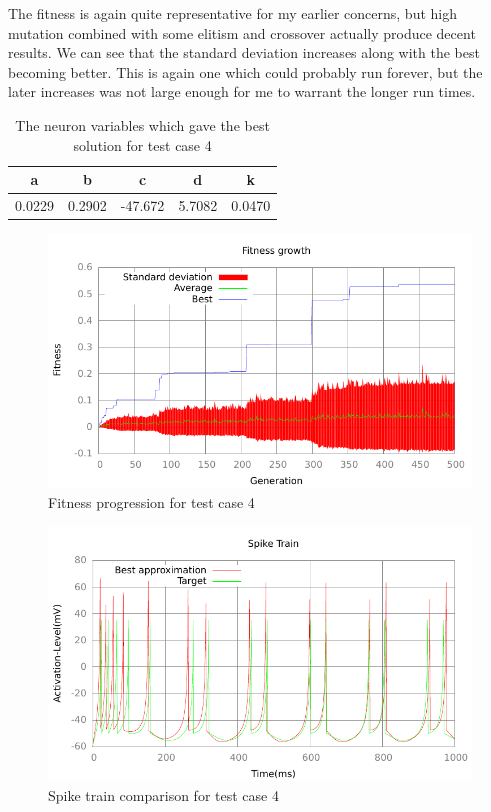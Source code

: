 The fitness is again quite representative for my earlier concerns, but high
mutation combined with some elitism and crossover actually produce decent
results. We can see that the standard deviation increases along with the best
becoming better. This is again one which could probably run forever, but the
later increases was not large enough for me to warrant the longer run times.
\begin{table}
	\begin{tabular}{c c c c c}
		a & b & c & d & k \\
		\hline
		0.0229 & 0.2902 & -47.672 & 5.7082 & 0.0470
	\end{tabular}
	\caption{The neuron variables which gave the best solution for test case
	4}
\end{table}
\begin{figure}[h]
	\centering
	\includegraphics{../output/stdm_izzy_2_fitness.pdf}
	\caption{Fitness progression for test case 4}
	\label{fig:fitness-test-case-4}
\end{figure}
\begin{figure}[h]
	\centering
	\includegraphics{../output/stdm_izzy_2_spike.pdf}
	\caption{Spike train comparison for test case 4}
	\label{fig:spike-test-case-4}
\end{figure}

